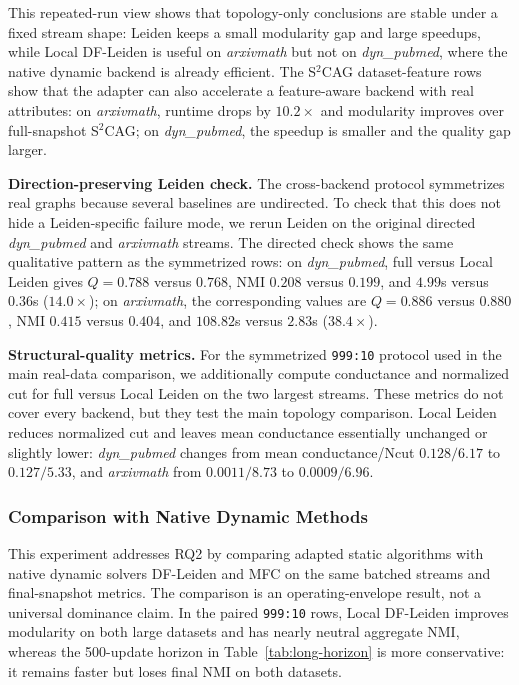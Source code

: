 \documentclass[conference]{IEEEtran}
\theoremstyle{definition}
\begin{document}
This repeated-run view shows that topology-only conclusions are stable under a
fixed stream shape: Leiden keeps a small modularity gap and large speedups, while
Local DF-Leiden is useful on \textit{arxivmath} but not on
\textit{dyn\_pubmed}, where the native dynamic backend is already efficient.
The S$^2$CAG dataset-feature rows show that the adapter can also accelerate a
feature-aware backend with real attributes: on \textit{arxivmath}, runtime drops
by $10.2\times$ and modularity improves over full-snapshot S$^2$CAG; on
\textit{dyn\_pubmed}, the speedup is smaller and the quality gap larger.

\textbf{Direction-preserving Leiden check.}
The cross-backend protocol symmetrizes real graphs because several baselines are
undirected. To check that this does not hide a Leiden-specific failure mode, we
rerun Leiden on the original directed \textit{dyn\_pubmed} and
\textit{arxivmath} streams. The directed check shows the same qualitative
pattern as the symmetrized rows: on \textit{dyn\_pubmed}, full versus Local
Leiden gives $Q=0.788$ versus $0.768$, NMI $0.208$ versus $0.199$, and
$4.99$s versus $0.36$s ($14.0\times$); on \textit{arxivmath}, the corresponding
values are $Q=0.886$ versus $0.880$, NMI $0.415$ versus $0.404$, and $108.82$s
versus $2.83$s ($38.4\times$).

\textbf{Structural-quality metrics.}
For the symmetrized \texttt{999:10} protocol used in the main real-data
comparison, we additionally compute conductance and normalized cut for full
versus Local Leiden on the two largest streams. These metrics do not cover every
backend, but they test the main topology comparison. Local Leiden reduces
normalized cut and leaves mean conductance essentially unchanged or slightly
lower:
\textit{dyn\_pubmed} changes from mean conductance/Ncut $0.128/6.17$ to
$0.127/5.33$, and \textit{arxivmath} from $0.0011/8.73$ to $0.0009/6.96$.

\subsubsection{Comparison with Native Dynamic Methods}

This experiment addresses RQ2 by comparing adapted static algorithms with native
dynamic solvers DF-Leiden and MFC on the same batched streams and final-snapshot
metrics. The comparison is an operating-envelope result, not a universal
dominance claim. In the paired \texttt{999:10} rows, Local DF-Leiden improves
modularity on both large datasets and has nearly neutral aggregate NMI, whereas
the 500-update horizon in Table~\ref{tab:long-horizon} is more conservative:
it remains faster but loses final NMI on both datasets.
\end{document}
